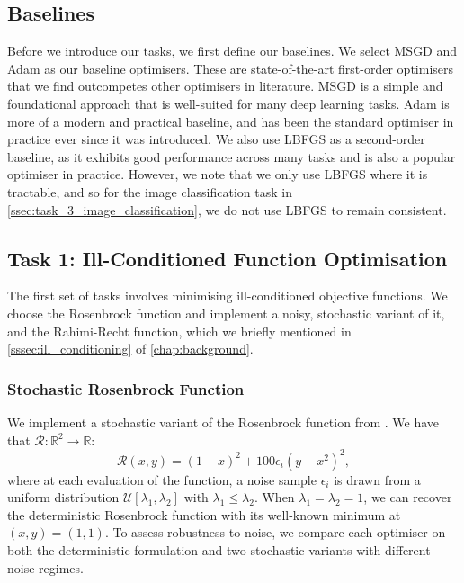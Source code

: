 \subsection{Baselines}
\label{ssec:baselines}
Before we introduce our tasks, we first define our baselines. We select MSGD and Adam as our baseline optimisers. These are state-of-the-art first-order optimisers that we find outcompetes other optimisers in literature. MSGD is a simple and foundational approach that is well-suited for many deep learning tasks. Adam is more of a modern and practical baseline, and has been the standard optimiser in practice ever since it was introduced. We also use LBFGS as a second-order baseline, as it exhibits good performance across many tasks and is also a popular optimiser in practice. However, we note that we only use LBFGS where it is tractable, and so for the image classification task in \cref{ssec:task_3_image_classification}, we do not use LBFGS to remain consistent.

\subsection{Task 1: Ill-Conditioned Function Optimisation}
\label{ssec:task_1_ill_conditioned_function_optimisation}
The first set of tasks involves minimising ill-conditioned objective functions. We choose the Rosenbrock function and implement a noisy, stochastic variant of it, and the Rahimi-Recht function, which we briefly mentioned in \cref{sssec:ill_conditioning} of \cref{chap:background}.

\subsubsection{Stochastic Rosenbrock Function}
\label{sssec:task_1_rosenbrock_function}
We implement a stochastic variant of the Rosenbrock function from \cite{henriques2019small}. We have that $\mathcal{R}: \mathbb{R}^2 \rightarrow \mathbb{R}$:
\begin{equation}
\mathcal{R}(x, y) = (1 - x)^2 + 100\epsilon_i(y - x^2)^2,
\end{equation}
where at each evaluation of the function, a noise sample $\epsilon_i$ is drawn from a uniform distribution $\mathcal{U}[\lambda_1, \lambda_2]$ with $\lambda_1 \leq \lambda_2$. When $\lambda_1 = \lambda_2 = 1$, we can recover the deterministic Rosenbrock function with its well-known minimum at $(x, y) = (1, 1)$. To assess robustness to noise, we compare each optimiser on both the deterministic formulation and two stochastic variants with different noise regimes.

